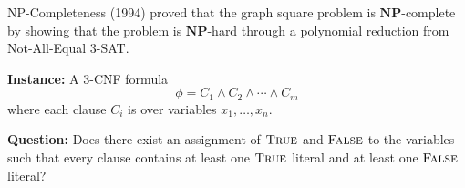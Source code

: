\documentclass[10pt]{beamer}
\begin{document}
\begin{frame}{NP-Completeness}
    \citeauthor{motwani_sudan_1994_roots} (1994) proved that the graph square problem is $\mathbf{NP}$-complete by showing that the problem is $\mathbf{NP}$-hard through a polynomial reduction from Not-All-Equal $3$-SAT. 
    
    \begin{problem}[NAESAT] \label{prob::naesat_problem}
        \leavevmode

        \textbf{Instance:} A $3$-CNF formula
        \[
        \phi = C_1 \land C_2 \land \cdots \land C_m
        \]
        where each clause $C_i$ is over variables $x_1,\ldots,x_n$.

        \medskip

        \textbf{Question:} Does there exist an assignment of $\textsc{True}$ and $\textsc{False}$ to the variables such that every clause contains at least one $\textsc{True}$ literal and at least one $\textsc{False}$ literal?
    \end{problem}
\end{frame}
\end{document}
